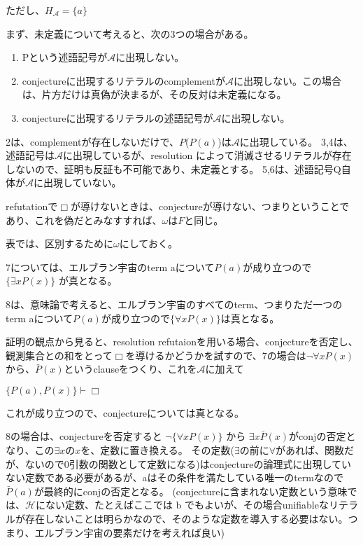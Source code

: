 \documentclass[10pt, oneside]{jarticle}   	%
\theoremstyle{definition}
\newcommand{\undet}{\omega}
\newcommand{\cont}{\Box}
\newcommand{\eset}[1]{\{{#1}\}}
\begin{document}
ただし、$H_{\mathcal{A}} = \eset{a}$


まず、未定義について考えると、次の3つの場合がある。
\begin{enumerate}
\item Pという述語記号が$\mathcal{A}$に出現しない。
\item conjectureに出現するリテラルのcomplementが$\mathcal{A}$に出現しない。この場合は、片方だけは真偽が決まるが、その反対は未定義になる。
\item conjectureに出現するリテラルの述語記号が$\mathcal{A}$に出現しない。
\end{enumerate}

2は、complementが存在しないだけで、$P$($P(a)$)は$\mathcal{A}$に出現している。
3,4は、述語記号は$\mathcal{A}$に出現しているが、resolution によって消滅させるリテラルが存在しないので、証明も反証も不可能であり、未定義とする。
5,6は、述語記号Q自体が$\mathcal{A}$に出現していない。

refutationで$\cont$が導けないときは、conjectureが導けない、つまりということであり、これを偽だとみなすすれば、$\undet$は$F$と同じ。

表では、区別するために$\undet$にしておく。

7については、エルブラン宇宙のterm aについて$P(a)$が成り立つので$\{\exists x P(x)\}$ が真となる。

8は、意味論で考えると、エルブラン宇宙のすべてのterm、つまりただ一つのterm aについて$P(a)$が成り立つので$\{\forall x P(x)\}$は真となる。

証明の観点から見ると、resolution refutaionを用いる場合、conjectureを否定し、観測集合との和をとって$\cont$を導けるかどうかを試すので、7の場合は$\neg \forall x P(x)$から、$\bar P(x)$というclauseをつくり、これを$\mathcal{A}$に加えて

$\{P(a), P(x)\} \vdash \cont$ 

これが成り立つので、conjectureについては真となる。

8の場合は、conjectureを否定すると $\neg \{\forall x P(x)\}$ から $\exists x \bar P(x)$がconjの否定となり、この$\exists x$の$x$を、定数に置き換える。
その定数($\exists$の前に$\forall$があれば、関数だが、ないので0引数の関数として定数になる)はconjectureの論理式に出現していない定数である必要があるが、aはその条件を満たしている唯一のtermなので $\bar P(a)$が最終的にconjの否定となる。
(conjectureに含まれない定数という意味では、$\mathcal{H}$にない定数、たとえばここでは b でもよいが、その場合unifiableなリテラルが存在しないことは明らかなので、そのような定数を導入する必要はない。つまり、エルブラン宇宙の要素だけを考えれば良い)
\end{document}
